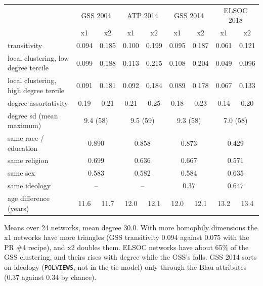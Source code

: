 \documentclass[11pt,a4paper]{article}
\newcommand{\code}[1]{\texttt{#1}}
\begin{document}
\begin{center}
\scriptsize
\setlength{\tabcolsep}{3.5pt}
\begin{tabular}{@{}lcccccccc@{}}
\toprule
 & \multicolumn{2}{c}{GSS 2004} & \multicolumn{2}{c}{ATP 2014} & \multicolumn{2}{c}{GSS 2014} & \multicolumn{2}{c}{ELSOC 2018} \\
 & x1 & x2 & x1 & x2 & x1 & x2 & x1 & x2 \\
\midrule
transitivity & 0.094 & 0.185 & 0.100 & 0.199 & 0.095 & 0.187 & 0.061 & 0.121 \\
local clustering, low degree tercile & 0.099 & 0.188 & 0.113 & 0.215 & 0.108 & 0.204 & 0.049 & 0.096 \\
local clustering, high degree tercile & 0.091 & 0.181 & 0.092 & 0.184 & 0.089 & 0.178 & 0.067 & 0.133 \\
degree assortativity & 0.19 & 0.21 & 0.21 & 0.25 & 0.18 & 0.23 & 0.14 & 0.20 \\
degree sd (mean maximum) & \multicolumn{2}{c}{9.4 (58)} & \multicolumn{2}{c}{9.5 (59)} & \multicolumn{2}{c}{9.3 (58)} & \multicolumn{2}{c}{7.0 (58)} \\
same race / education & \multicolumn{2}{c}{0.890} & \multicolumn{2}{c}{0.858} & \multicolumn{2}{c}{0.873} & \multicolumn{2}{c}{0.429} \\
same religion & \multicolumn{2}{c}{0.699} & \multicolumn{2}{c}{0.636} & \multicolumn{2}{c}{0.667} & \multicolumn{2}{c}{0.571} \\
same sex & \multicolumn{2}{c}{0.583} & \multicolumn{2}{c}{0.582} & \multicolumn{2}{c}{0.584} & \multicolumn{2}{c}{0.635} \\
same ideology & \multicolumn{2}{c}{--} & \multicolumn{2}{c}{--} & \multicolumn{2}{c}{0.37} & \multicolumn{2}{c}{0.647} \\
age difference (years) & 11.6 & 11.7 & 12.0 & 12.1 & 12.0 & 12.1 & 13.2 & 13.4 \\
\bottomrule
\end{tabular}
\end{center}

\noindent Means over 24 networks, mean degree 30.0. With more homophily dimensions the x1 networks have
more triangles (GSS transitivity 0.094 against 0.075 with the PR \#4 recipe), and x2 doubles them. ELSOC
networks have about 65\% of the GSS clustering, and theirs rises with degree while the GSS's falls. GSS 2014
sorts on ideology (\code{POLVIEWS}, not in the tie model) only through the Blau attributes (0.37 against 0.34
by chance).

\end{document}
